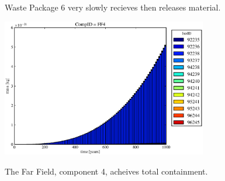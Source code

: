 \begin{frame}
\begin{figure}[ht]
\begin{minipage}[b]{0.45\linewidth}
  \caption[Case ODI Waste Package Contaminants.]{ 
    Waste Package 6 very slowly recieves then releases material. 
    }
  \label{fig:drIVwp6}
  \includegraphics[width=0.8\textwidth]{./images/od0.eps}
  \caption[Case ODI Waste Package Contaminants.]{ 
    The Far Field, component 4, acheives total containment.
    }
  \label{fig:drIVff0}


  \end{minipage}
\end{figure}
\end{frame}
